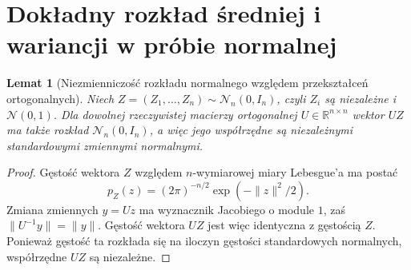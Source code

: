 \documentclass[11pt,a4paper,oneside]{report}
\numberwithin{equation}{chapter}
\theoremstyle{plain}
\newtheorem{lemat}[twierdzenie]{Lemat}
\theoremstyle{definition}
\theoremstyle{remark}
\newcommand{\R}{\mathbb R}
\newcommand{\norm}[1]{\lVert#1\rVert}
\newcommand{\Normal}{\mathcal N}
\begin{document}
\section{Dokładny rozkład średniej i wariancji w próbie normalnej}
\begin{lemat}[Niezmienniczość rozkładu normalnego względem przekształceń ortogonalnych]\label{lem:gauss-rotation}
Niech $Z=(Z_1,\ldots,Z_n)\sim\Normal_n(0,I_n)$, czyli $Z_i$ są niezależne i $\Normal(0,1)$. Dla dowolnej rzeczywistej macierzy ortogonalnej $U\in\R^{n\times n}$ wektor $UZ$ ma także rozkład $\Normal_n(0,I_n)$, a więc jego współrzędne są niezależnymi standardowymi zmiennymi normalnymi.
\end{lemat}
\begin{proof}
Gęstość wektora $Z$ względem $n$-wymiarowej miary Lebesgue'a ma postać
\[
 p_Z(z)=(2\pi)^{-n/2}\exp(-\norm{z}^2/2).
\]
Zmiana zmiennych $y=Uz$ ma wyznacznik Jacobiego o module $1$, zaś $\norm{U^{-1}y}=\norm y$. Gęstość wektora $UZ$ jest więc identyczna z gęstością $Z$. Ponieważ gęstość ta rozkłada się na iloczyn gęstości standardowych normalnych, współrzędne $UZ$ są niezależne.
\end{proof}
\end{document}
